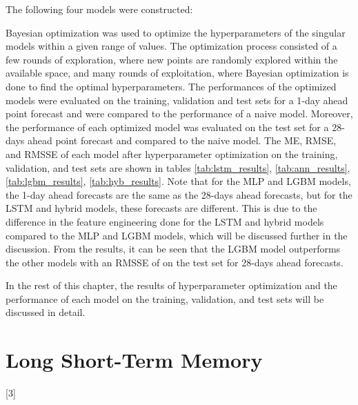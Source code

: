 The following four models were constructed: 
\begin{enumerate}
\end{enumerate}
Bayesian optimization was used to optimize the hyperparameters of the singular models within a given range of values.
The optimization process consisted of a few rounds of exploration, where new points are randomly explored within the available space, and many rounds of exploitation, where Bayesian optimization is done to find the optimal hyperparameters.
The performances of the optimized models were evaluated on the training, validation and test sets for a 1-day ahead point forecast and were compared to the performance of a naive model.
Moreover, the performance of each optimized model was evaluated on the test set for a 28-days ahead point forecast and compared to the naive model.
The ME, RMSE, and RMSSE of each model after hyperparameter optimization on the training, validation, and test sets are shown in tables \ref{tab:lstm_results}, \ref{tab:ann_results}, \ref{tab:lgbm_results}, \ref{tab:hyb_results}.
Note that for the MLP and LGBM models, the 1-day ahead forecasts are the same as the 28-days ahead forecasts, but for the LSTM and hybrid models, these forecasts are different.
This is due to the difference in the feature engineering done for the LSTM and hybrid models compared to the MLP and LGBM models, which will be discussed further in the discussion.
From the results, it can be seen that the LGBM model outperforms the other models with an RMSSE of \lgbmTstMonRMSSE{} on the test set for 28-days ahead forecasts.

In the rest of this chapter, the results of hyperparameter optimization and the performance of each model on the training, validation, and test sets will be discussed in detail. 

\section{Long Short-Term Memory}
[3]

